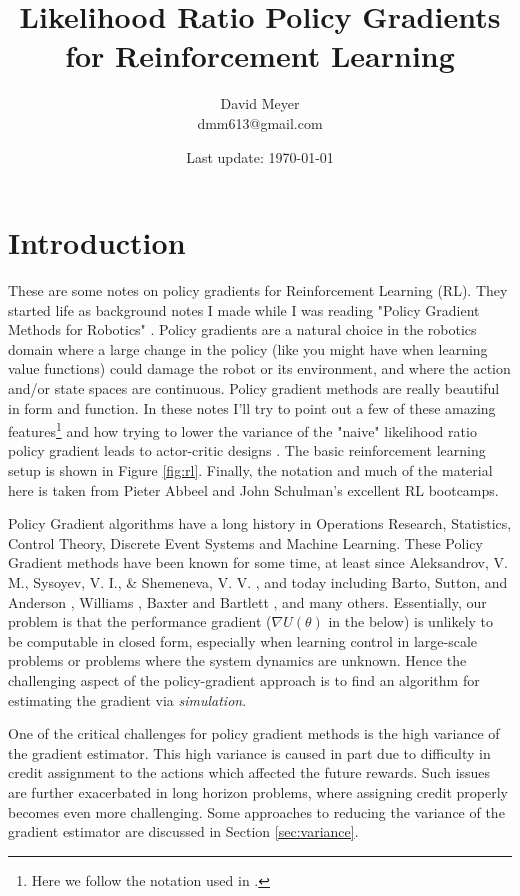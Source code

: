 \documentclass[11pt, oneside]{article}                          %
\title{Likelihood Ratio Policy Gradients for Reinforcement Learning}
\author{David Meyer \\ dmm613@gmail.com}
\date{Last update: \today}					%
\begin{document}
\maketitle

\section{Introduction} 
\label{sec:intro}
These are some notes on policy gradients for Reinforcement
Learning (RL). They started life as background notes I made while
I was reading "Policy Gradient Methods for Robotics"
\cite{Peters:2006fk}.  Policy gradients are a natural choice in
the robotics domain where a large change in the policy (like you
might have when learning value functions) could damage the robot
or its environment, and where the action and/or state spaces are
continuous. Policy gradient methods are really beautiful in form
and function. In these notes I'll try to point out a few of these
amazing features\footnote{Here we follow the notation used in
\cite{SuttonBook}.} and how trying to lower the variance of the
"naive" likelihood ratio policy gradient leads to actor-critic
designs \cite{NIPS1999_1786}. The basic reinforcement learning
setup is shown in Figure \ref{fig:rl}.  Finally, the notation and
much of the material here is taken from Pieter Abbeel and John
Schulman's excellent RL bootcamps.



\bigskip
\noindent
Policy Gradient algorithms have a long history in Operations
Research, Statistics, Control Theory, Discrete Event Systems and
Machine Learning. These Policy Gradient methods have been known
for some time, at least since Aleksandrov, V. M., Sysoyev, V. I.,
\& Shemeneva, V. V. \cite{oALE68a}, and today including Barto,
Sutton, and Anderson \cite{Barto1983NeuronlikeAE}, Williams
\cite{Williams1992}, Baxter and Bartlett
\cite{Baxter:2001:IPE:1622845.1622855}, and many
others. Essentially, our problem is that the performance gradient
($\nabla U(\theta)$ in the below) is unlikely to be computable in
closed form, especially when learning control in large-scale
problems or problems where the system dynamics are unknown. Hence
the challenging aspect of the policy-gradient approach is to find
an algorithm for estimating the gradient via \emph{simulation}.

\bigskip
\noindent
One of the critical challenges for policy gradient methods is the
high variance of the gradient estimator. This high variance is
caused in part due to difficulty in credit assignment to the
actions which affected the future rewards. Such issues are
further exacerbated in long horizon problems, where assigning
credit properly becomes even more challenging. Some approaches to
reducing the variance of the gradient estimator are discussed in
Section \ref{sec:variance}.
\end{document}
